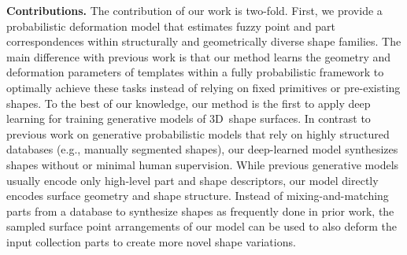 
\textbf{Contributions.} The contribution of our work is two-fold. First, we provide a probabilistic deformation model that estimates fuzzy point and part correspondences within structurally and geometrically diverse shape families. The main difference with previous work is that our method learns the geometry and deformation parameters of templates within a fully probabilistic framework to optimally achieve these tasks instead of relying on fixed primitives or pre-existing shapes.  To the best of our knowledge, our method is the first to apply deep learning for training generative models of 3D\ shape surfaces. In contrast to previous work on generative probabilistic models that rely on highly structured databases (e.g., manually segmented shapes), our deep-learned model synthesizes shapes without or minimal human supervision. While previous generative models usually encode only high-level part and shape descriptors, our model directly encodes surface geometry and shape structure. Instead of mixing-and-matching parts from a database to synthesize shapes as frequently done in prior work, the sampled surface point arrangements of our model can be used to also deform the input collection parts to create more novel shape variations. 
